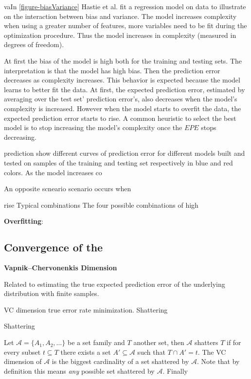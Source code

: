 vaIn \ref{figure-biasVariance} Hastie et al. fit a regression model on data to illustrate on the interaction between bias and variance. The model increases complexity when using a greater number of features, more variables need to be fit during the optimization procedure. Thus the model increases in complexity (measured in degrees of freedom). 

At first the bias of the model is high both for the training and testing sets. The interpretation is that the model has high bias. Then the prediction error decreases as complexity increases. This behavior is expected because the model learns to better fit the data. At first, the expected prediction error, estimated by averaging over the test set' prediction error's, also decreases when the model's complexity is increased. However when the model starts to overfit the data, the expected prediction error starts to rise. A common heuristic to select the best model is to stop increasing the model's complexity once the $EPE$ stops decreasing.


prediction 
show different curves of prediction error for different models built and tested on samples of the training and testing set respectively in blue and red colors. As the model increases co

An opposite scneario scenario occurs when

rise Typical combinations
The four possible combinations of high 


\textbf{Overfitting}: 
 




\subsection{Convergence of the }
\textbf{Vapnik–Chervonenkis Dimension}
\cite{vapnik-nature2013}
\cite{cherkassky-learning2007}

Related to estimating the true expected prediction error of the underlying distribution with finite samples.

VC dimension true error rate minimization. 
Shattering
\begin{definition}{Shattering}

Let $\mathcal {A}= \{A_1,A_{2},\dots \}$ be a set family and $T$  another set, then $\mathcal {A}$ shatters $T$ if for every subset $t \subseteq T$ there exists a set $A' \subseteq \mathcal {A} $ such that $ T \cap A' = t$. The VC dimension of $\mathcal {A}$ is the biggest cardinality of a set shattered by $\mathcal {A}$. Note that by definition this means \textit{any} possible set shattered by $\mathcal {A}$. Finally
 \end{definition}


